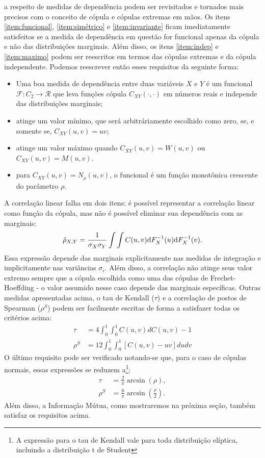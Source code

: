  a respeito de medidas de dependência podem ser revisitados e tornados mais precisos com o conceito de cópula e cópulas extremas em mãos. Os itens \ref{item:funcional}, \ref{item:simétrico} e \ref{item:invariante} ficam imediatamente satisfeitos se a medida de dependência em questão for funcional apenas da cópula e não das distribuições marginais. Além disso, os itens \ref{item:indep} e \ref{item:maximo} podem ser reescritos em termos das cópulas extremas e da cópula independente. Podemos reescrever então esses requisitos da seguinte forma:
\begin{itemize}
\item Uma boa medida de dependência entre duas variáveis $X$ e $Y$ é um funcional $\mathcal{F} : C_{2} \to \mathcal{R}$ que leva funções cópula $C_{XY}(\cdot, \cdot)$ em números reais e independe das distribuições marginais;
\item atinge um valor mínimo, que será arbitráriamente escolhido como zero, se, e somente se, $C_{XY}(u,v) = uv$;
\item atinge um valor máximo quando $C_{XY}(u,v) = W(u,v)$ ou $C_{XY}(u,v) = M(u,v)$.
\item para $C_{XY}(u,v) = N_{\rho}(u,v)$, o funcional é um função monotônica crescente do parâmetro  $\rho$. 
\end{itemize}
A correlação linear falha em dois itens: é possível representar a correlação linear como função da cópula, mas não é possível eliminar sua dependência com as marginais:
\begin{equation*}
 \hat{\rho}_{X,Y} = \frac{1}{\sigma_X\sigma_Y}\int\int C(u,v) \mathrm{d} F_{X}^{-1}(u) \mathrm{d} F_{X}^{-1}(v).
\end{equation*}
Essa expressão depende das marginais explicitamente nas medidas de integração e implicitamente nas variâncias $\sigma_i$. Além disso, a correlação não atinge seus valor extremo sempre que a cópula escolhida como uma das cópulas de Frechet-Hoeffding - o valor assumido nesse caso depende das marginais específicas. Outras medidas apresentadas acima, o tau de Kendall ($\tau$) e a correlação de postos de Spearman ($\rho^{S}$) podem ser facilmente escritas de forma a satisfazer todas os critérios acima:
\begin{align}
\tau & = 4 \int_0^1\int_0^1 C(u,v) dC(u,v)  - 1  \\
\rho^{S} &=  12 \int_0^1\int_0^1 \left[C(u,v) - uv\right] du dv
\end{align}
O último requisito pode ser verificado notando-se que, para o caso de cópulas normais, essas expressões se reduzem a\footnote{A expressão para o tau de Kendall vale para toda distribuição elíptica, incluindo a distribuição t de Student}:
\begin{align}
\tau &= \frac{2}{\pi} \arcsin(\rho), \\
\rho^{S} &= \frac{6}{\pi} \arcsin\left(\frac{\rho}{2}\right).
\end{align}
Além disso, a Informação Mútua, como mostraremos na próxima seção, também satisfaz os requisitos acima.
